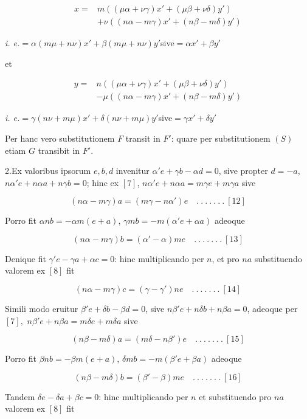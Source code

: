 \[
\begin{aligned}x={}&m((\mu\alpha+\nu\gamma)x'+(\mu\beta+\nu\delta)y')\\&+\nu((n\alpha-m\gamma)x'+(n\beta-m\delta)y')\end{aligned}
\]

\emph{i. e.}\qquad $=\alpha(m\mu+n\nu)x'+\beta(m\mu+n\nu)y'$\quad sive\quad $=\alpha x'+\beta y'$

et

\[
\begin{aligned}y={}&n((\mu\alpha+\nu\gamma)x'+(\mu\beta+\nu\delta)y')\\&-\mu((n\alpha-m\gamma)x'+(n\beta-m\delta)y')\end{aligned}
\]

\emph{i. e.}\qquad $=\gamma(n\nu+m\mu)x'+\delta(n\nu+m\mu)y'$\quad sive\quad $=\gamma x'+\delta y'$


Per hanc vero substitutionem $F$ transit in $F'$: quare per substitutionem $(S)$ etiam $G$ transibit in $F'$.

2.\quad Ex valoribus ipsorum $e,b,d$ invenitur $\alpha'e+\gamma b-\alpha d=0$, sive propter $d=-a$, $n\alpha'e+n\alpha a+n\gamma b=0$; hinc ex $[7]$, $n\alpha'e+n\alpha a=m\gamma e+m\gamma a$ sive

\[
(n\alpha-m\gamma)a=(m\gamma-n\alpha')e\quad .\ .\ .\ .\ .\ .\ .\ [12]
\]

Porro fit $\alpha nb=-\alpha m(e+a)$, $\gamma mb=-m(\alpha'e+\alpha a)$ adeoque

\[
(n\alpha-m\gamma)b=(\alpha'-\alpha)me\quad .\ .\ .\ .\ .\ .\ .\ [13]
\]

Denique fit $\gamma'e-\gamma a+\alpha c=0$: hinc multiplicando per $n$, et pro $na$ substituendo valorem ex $[8]$ fit

\[
(n\alpha-m\gamma)c=(\gamma-\gamma')ne\quad .\ .\ .\ .\ .\ .\ .\ [14]
\]

Simili modo eruitur $\beta'e+\delta b-\beta d=0$, sive $n\beta'e+n\delta b+n\beta a=0$, adeoque per $[7],$ $n\beta'e+n\beta a=m\delta e+m\delta a$ sive

\[
(n\beta-m\delta)a=(m\delta-n\beta')e\quad .\ .\ .\ .\ .\ .\ .\ [15]
\]

Porro fit $\beta nb=-\beta m(e+a)$, $\delta mb=-m(\beta'e+\beta a)$ adeoque

\[
(n\beta-m\delta)b=(\beta'-\beta)me\quad .\ .\ .\ .\ .\ .\ .\ [16]
\]

Tandem $\delta e-\delta a+\beta c=0$: hinc multiplicando per $n$ et substituendo pro $na$ valorem ex $[8]$ fit

